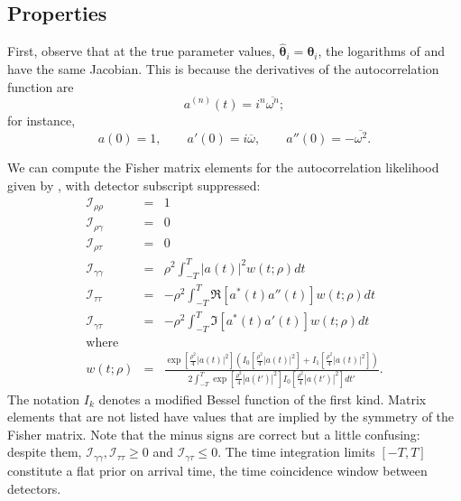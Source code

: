\documentclass{iopart}
\begin{document}
\subsection{Properties}

First, observe that at the true parameter values, $\hat{\boldsymbol\theta}_i = \boldsymbol\theta_i$, the logarithms of  and  have the same Jacobian. This is because the derivatives of the autocorrelation function are
%
\begin{equation*}
    a^{(n)}(t) = i^n \overline{\omega^n};
\end{equation*}
%
for instance,
%
\begin{equation*}
    a(0) = 1,
    \qquad
    a'(0) = i \overline{\omega},
    \qquad
    a''(0) = -\overline{\omega^2}.
\end{equation*}

We can compute the Fisher matrix elements for the autocorrelation likelihood given by , with detector subscript suppressed:
%
\begin{eqnarray}
    \nonumber
    \mathcal{I}_{\rho\rho} &=& 1 \\
    \nonumber
    \mathcal{I}_{\rho\gamma} &=& 0 \\
    \nonumber
    \mathcal{I}_{\rho\tau} &=& 0 \\
    \label{eq:fisher-autocor-gamma-gamma}
    \mathcal{I}_{\gamma\gamma} &=& \rho^2
        \int_{-T}^T \left|a(t)\right|^2 w(t; \rho) dt \\
    \label{eq:fisher-autocor-tau-tau}
    \mathcal{I}_{\tau\tau} &=& -\rho^2
        \int_{-T}^T \Re\left[a^*(t) a''(t)\right] w(t; \rho) dt \\
    \label{eq:fisher-autocor-gamma-tau}
    \mathcal{I}_{\gamma\tau} &=& -\rho^2
        \int_{-T}^T \Im\left[a^*(t) a'(t)\right] w(t; \rho) dt \\
    \nonumber\textrm{where} && \\
    w(t; \rho) &=& \frac{
        \displaystyle
        \exp\left[\frac{\rho^2}{4}\left|a(t)\right|^2\right]
        \left(
        I_0\left[\frac{\rho^2}{4}\left|a(t)\right|^2\right] +
        I_1\left[\frac{\rho^2}{4}\left|a(t)\right|^2\right]
        \right)
    }{
        \displaystyle
        2 \int_{-T}^T
        \exp\left[\frac{\rho^2}{4}\left|a(t')\right|^2\right]
        I_0\left[\frac{\rho^2}{4}\left|a(t')\right|^2\right]
        dt'
    }.
\end{eqnarray}
%
The notation $I_k$ denotes a modified Bessel function of the first kind. Matrix elements that are not listed have values that are implied by the symmetry of the Fisher matrix. Note that the minus signs are correct but a little confusing: despite them, $\mathcal{I}_{\gamma\gamma}, \mathcal{I}_{\tau\tau} \geq 0$ and $\mathcal{I}_{\gamma\tau} \leq 0$. The time integration limits $[-T, T]$ constitute a flat prior on arrival time, the time coincidence window between detectors.
\end{document}
